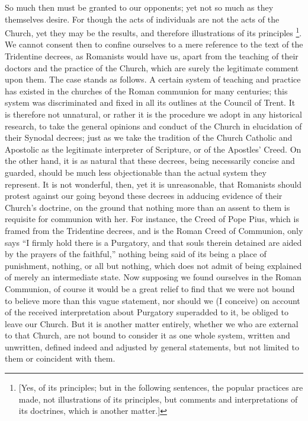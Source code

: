 So much then must be granted to our opponents;
yet not so much as they themselves desire. For though the acts of
individuals are not the acts of the Church, yet they may be the
results, and therefore illustrations of its principles \footnote{[Yes, of its principles; but in the following sentences, the popular
practices are made, not illustrations of its principles, but comments
and interpretations of its doctrines, which is another matter.]}. We cannot consent then to confine ourselves to a mere
reference to the text of the Tridentine decrees, as Romanists would
have us, apart from the teaching of their doctors and the practice of
the Church, which are surely the legitimate comment upon them. The
case stands as follows. A certain system of teaching and practice has
existed in the churches of the Roman communion for many centuries;
this system was discriminated and fixed in all its outlines at the
Council of Trent. It is therefore not unnatural, or rather it is the
procedure we adopt in any historical research, to take the general
opinions and conduct of the Church in elucidation of their Synodal
decrees; just as we take the tradition of the Church Catholic and
Apostolic as the legitimate interpreter of Scripture, or of the
Apostles' Creed. On the other hand, it is as natural that these
decrees, being necessarily concise and guarded, should be much less
objectionable than the actual system they represent. It is not
wonderful, then, yet it is unreasonable, that Romanists should protest
against our going beyond these decrees in adducing evidence of their
Church's doctrine, on the ground that nothing more than an assent to
them is requisite for communion with her. For instance, the Creed of
Pope Pius, which is framed from the Tridentine decrees, and is the
Roman Creed of Communion, only says ``I firmly hold there is a
Purgatory, and that souls therein detained are aided by the prayers of
the faithful,'' nothing being said of its being a place of punishment,
nothing, or all but nothing, which does not admit of being explained
of merely an intermediate state. Now supposing we found ourselves in
the Roman Communion, of course it would be a great relief to find that
we were not bound to believe more than this vague statement, nor
should we (I conceive) on account of the received interpretation about
Purgatory superadded to it, be obliged to leave our Church. But it is
another matter entirely, whether we who are external to that Church,
are not bound to consider it as one whole system, written and
unwritten, defined indeed and adjusted by general statements, but not
limited to them or coincident with them.

